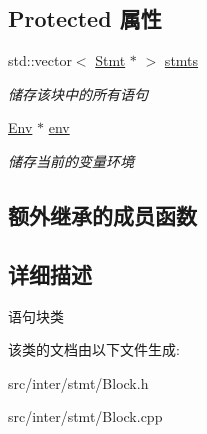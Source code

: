 \subsection*{Protected 属性}
\begin{DoxyCompactItemize}
\item 
\mbox{\label{class_block_a88f627f956bdc80d9d697f0755130d34}} 
std\+::vector$<$ \hyperlink{class_stmt}{Stmt} $\ast$ $>$ \hyperlink{class_block_a88f627f956bdc80d9d697f0755130d34}{stmts}
\begin{DoxyCompactList}\small\item\em 储存该块中的所有语句 \end{DoxyCompactList}\item 
\mbox{\label{class_block_a85617f1e8f9f4b998e9b1ebc4c3b37c4}} 
\hyperlink{class_env}{Env} $\ast$ \hyperlink{class_block_a85617f1e8f9f4b998e9b1ebc4c3b37c4}{env}
\begin{DoxyCompactList}\small\item\em 储存当前的变量环境 \end{DoxyCompactList}\end{DoxyCompactItemize}
\subsection*{额外继承的成员函数}


\subsection{详细描述}
语句块类 

该类的文档由以下文件生成\+:\begin{DoxyCompactItemize}
\item 
src/inter/stmt/Block.\+h\item 
src/inter/stmt/Block.\+cpp\end{DoxyCompactItemize}
